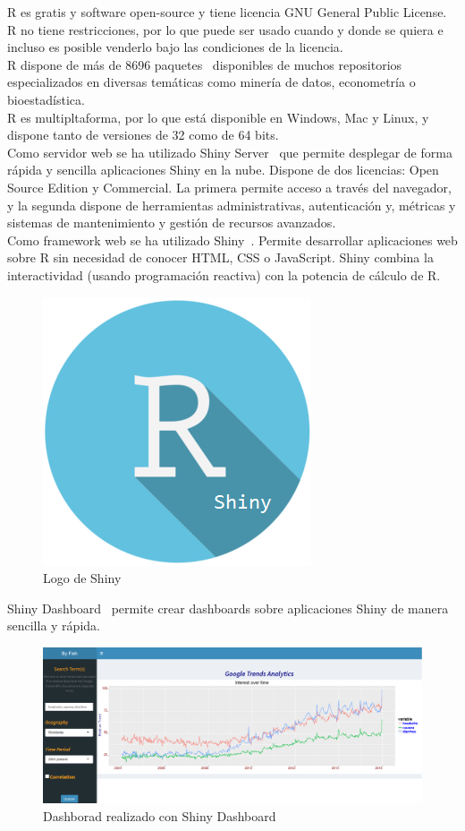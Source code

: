 R es gratis y software open-source y tiene licencia GNU General Public License. R no tiene restricciones, por lo que puede ser usado cuando y donde se quiera e incluso es posible venderlo bajo las condiciones de la licencia.\\

R dispone de más de 8696 paquetes~\cite{Rpaquetes} disponibles de muchos repositorios especializados en diversas temáticas como minería de datos, econometría o bioestadística.\\

R es multipltaforma, por lo que está disponible en Windows, Mac y Linux, y dispone tanto de versiones de 32 como de 64 bits.\\

Como servidor web se ha utilizado Shiny Server~\cite{ShinyServer} que permite desplegar de forma rápida y sencilla aplicaciones Shiny en la nube. Dispone de dos licencias: Open Source Edition y Commercial. La primera permite acceso a través del navegador, y la segunda dispone de herramientas administrativas, autenticación y, métricas y sistemas de mantenimiento y gestión de recursos avanzados.\\

Como framework web se ha utilizado Shiny~\cite{Shiny}. Permite desarrollar aplicaciones web sobre R sin necesidad de conocer HTML, CSS o JavaScript. Shiny combina la interactividad (usando programación reactiva) con la potencia de cálculo de R.\\

\begin{figure}[htbp!]
	\centering
	\includegraphics[width=0.3\linewidth]{imagenes/RShiny}
	\caption{Logo de Shiny}
	\label{fig:RShiny}
\end{figure}

Shiny Dashboard~\cite{ShinyDashboard} permite crear dashboards sobre aplicaciones Shiny de manera sencilla y rápida.\\

\begin{figure}
\centering
\includegraphics[width=0.7\linewidth]{imagenes/shinydashboard}
\caption{Dashborad realizado con Shiny Dashboard}
\label{fig:shinydashboard}
\end{figure}

